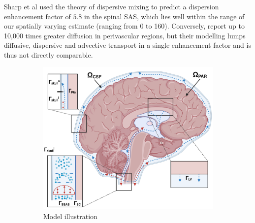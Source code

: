 \documentclass[fleqn,10pt]{wlscirep}
\begin{document}
Sharp et al used the theory of dispersive mixing to predict a dispersion enhancement factor of $5.8$ in the spinal SAS, which lies well within the range of our spatially varying estimate (ranging from 0 to 160). Conversely, \cite{ray2021quantitative} report up to 10,000 times greater diffusion in perivascular regions, but their modelling lumps diffusive, dispersive and advective transport in a single enhancement factor and is thus not directly comparable.



\begin{figure}[h!]
\centering 
\begin{subfigure}[b]{0.33\textwidth}
\includegraphics[width = 1 \textwidth]{figures/CSF flow & dispersion.png}
\caption{Model illustration}
\label{fig:csf_flow_geom}
\end{subfigure}
\begin{subfigure}[b]{0.33\textwidth}

\end{subfigure}
\end{figure}
\end{document}
